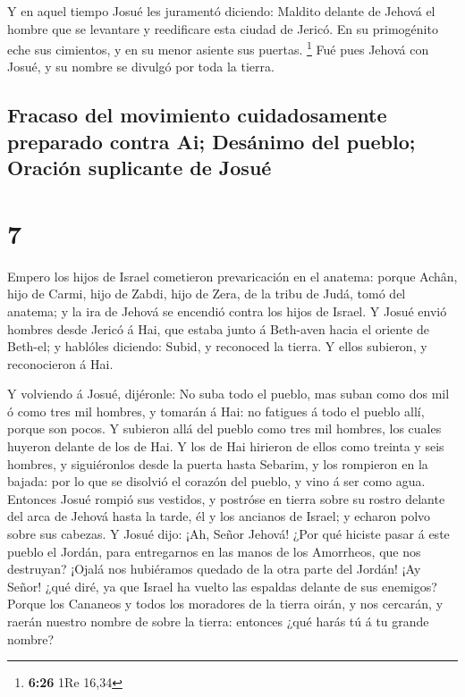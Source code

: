  Y en aquel tiempo Josué les juramentó diciendo: Maldito
delante de Jehová el hombre que se levantare y reedificare esta ciudad
de Jericó. En su primogénito eche sus cimientos, y en su menor asiente
sus puertas. \footnote{\textbf{6:26} 1Re 16,34}  Fué pues
Jehová con Josué, y su nombre se divulgó por toda la tierra.

\hypertarget{fracaso-del-movimiento-cuidadosamente-preparado-contra-ai-desuxe1nimo-del-pueblo-oraciuxf3n-suplicante-de-josuuxe9}{%
\subsection{Fracaso del movimiento cuidadosamente preparado contra Ai;
Desánimo del pueblo; Oración suplicante de
Josué}\label{fracaso-del-movimiento-cuidadosamente-preparado-contra-ai-desuxe1nimo-del-pueblo-oraciuxf3n-suplicante-de-josuuxe9}}

\hypertarget{section-6}{%
\section{7}\label{section-6}}

 Empero los hijos de Israel cometieron prevaricación en el
anatema: porque Achân, hijo de Carmi, hijo de Zabdi, hijo de Zera, de la
tribu de Judá, tomó del anatema; y la ira de Jehová se encendió contra
los hijos de Israel.  Y Josué envió hombres desde Jericó á
Hai, que estaba junto á Beth-aven hacia el oriente de Beth-el; y
hablóles diciendo: Subid, y reconoced la tierra. Y ellos subieron, y
reconocieron á Hai.

 Y volviendo á Josué, dijéronle: No suba todo el pueblo,
mas suban como dos mil ó como tres mil hombres, y tomarán á Hai: no
fatigues á todo el pueblo allí, porque son pocos.  Y
subieron allá del pueblo como tres mil hombres, los cuales huyeron
delante de los de Hai.  Y los de Hai hirieron de ellos
como treinta y seis hombres, y siguiéronlos desde la puerta hasta
Sebarim, y los rompieron en la bajada: por lo que se disolvió el corazón
del pueblo, y vino á ser como agua.  Entonces Josué rompió
sus vestidos, y postróse en tierra sobre su rostro delante del arca de
Jehová hasta la tarde, él y los ancianos de Israel; y echaron polvo
sobre sus cabezas.  Y Josué dijo: ¡Ah, Señor Jehová! ¿Por
qué hiciste pasar á este pueblo el Jordán, para entregarnos en las manos
de los Amorrheos, que nos destruyan? ¡Ojalá nos hubiéramos quedado de la
otra parte del Jordán!  ¡Ay Señor! ¿qué diré, ya que
Israel ha vuelto las espaldas delante de sus enemigos? 
Porque los Cananeos y todos los moradores de la tierra oirán, y nos
cercarán, y raerán nuestro nombre de sobre la tierra: entonces ¿qué
harás tú á tu grande nombre?

